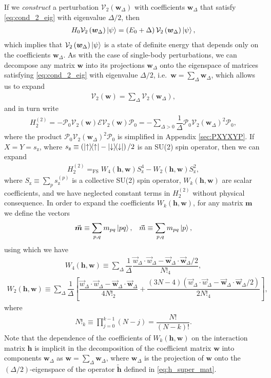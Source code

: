 \documentclass[nofootinbib,notitlepage,11pt]{revtex4-2}
\newcommand{\f}[2]{\dfrac{#1}{#2}} %
\newcommand{\p}[1]{\left(#1\right)} %
\renewcommand{\sp}[1]{\left[#1\right]} %
\renewcommand{\c}{\cdot} %
\newcommand{\m}{\bm} %
\renewcommand{\v}{\vec} %
\newcommand{\1}{\mathds{1}}
\newcommand{\up}{\uparrow}
\newcommand{\dn}{\downarrow}
\newcommand{\z}{\text{z}}
\newcommand{\E}{\mathcal{E}}
\renewcommand{\P}{\mathcal{P}}
\newcommand{\V}{\mathcal{V}}
\newcommand{\EQFS}{=_{\text{FS}}}
\begin{document}
If we {\it construct} a perturbation $\V_2\p{\m w_\Delta}$ with
coefficients $\m w_\Delta$ that satisfy \eqref{eq:cond_2_eig} with
eigenvalue $\Delta/2$, then
\begin{align}
  H_0 \V_2\p{\m w_\Delta} \ket\psi
  = \p{E_0 + \Delta} \V_2\p{\m w_\Delta} \ket\psi,
\end{align}
which implies that $\V_2\p{\m w_\Delta}\ket\psi$ is a state of
definite energy that depends only on the coefficients $\m w_\Delta$.
As with the case of single-body perturbations, we can decompose any
matrix $\m w$ into its projections $\m w_\Delta$ onto the eigenspace
of matrices satisfying \eqref{eq:cond_2_eig} with eigenvalue
$\Delta/2$, i.e.~$\m w=\sum_\Delta\m w_\Delta$, which allows us to
expand
\begin{align}
  \V_2\p{\m w} = \sum_\Delta \V_2\p{\m w_\Delta},
\end{align}
and in turn write
\begin{align}
  H_2^{(2)} = - \P_0 \V_2\p{\m w} \E \V_2\p{\m w} \P_0
  = -\sum_{\Delta>0} \f1\Delta \P_0 \V_2\p{\m w_\Delta}^2 \P_0,
\end{align}
where the product $\P_0 \V_2\p{\m w_\Delta}^2 \P_0$ is simplified in
Appendix \ref{sec:PXYXYP}.  If $X=Y=s_\z$, where
$s_\z\equiv\p{\op\up-\op\dn}/2$ is an SU(2) spin operator, then we can expand
\begin{align}
  H_2^{(2)} \EQFS W_4\p{\m h,\m w} S_\z^4 - W_2\p{\m h,\m w} S_\z^2,
\end{align}
where $S_\z\equiv\sum_p s_\z^{(p)}$ is a collective SU(2) spin
operator, $W_k\p{\m h,\m w}$ are scalar coefficients, and we have
neglected constant terms in $H_2^{(2)}$ without physical consequence.
In order to expand the coefficients $W_k\p{\m h,\m w}$, for any matrix
$\m m$ we define the vectors
\begin{align}
  \v{\m m} \equiv \sum_{p,q} m_{pq} \ket{pq},
  &&
  \v m \equiv \sum_{p,q} m_{pq} \ket{p},
\end{align}
using which we have
\begin{align}
  W_4\p{\m h,\m w}
  \equiv \sum_\Delta \f1\Delta \f{\v w_\Delta\c\v w_\Delta
    - \v{\m w}_\Delta\c\v{\m w}_\Delta/2}{N!_4},
\end{align}
\begin{align}
  W_2\p{\m h,\m w}
  \equiv \sum_\Delta \f1{\Delta} \sp{\f{\v w_\Delta\c\v w_\Delta
      - \v{\m w}_\Delta\c\v{\m w}_\Delta}{4N!_2}
    + \f{\p{3N-4}\p{\v w_\Delta\c\v w_\Delta
        - \v{\m w}_\Delta\c\v{\m w}_\Delta/2}}{2N!_4}},
\end{align}
where
\begin{align}
  N!_k \equiv \prod_{j=0}^{k-1} \p{N-j} = \f{N!}{\p{N-k}!}.
\end{align}
Note that the dependence of the coefficients of $W_k\p{\m h,\m w}$ on
the interaction matrix $\m h$ is implicit in the decomposition of the
coefficient matrix $\m w$ into components $\m w_\Delta$ as
$\m w=\sum_\Delta\m w_\Delta$, where $\m w_\Delta$ is the projection
of $\m w$ onto the $\p{\Delta/2}$-eigenspace of the operator
$\tilde{\m h}$ defined in \eqref{eq:h_super_mat}.
\end{document}
